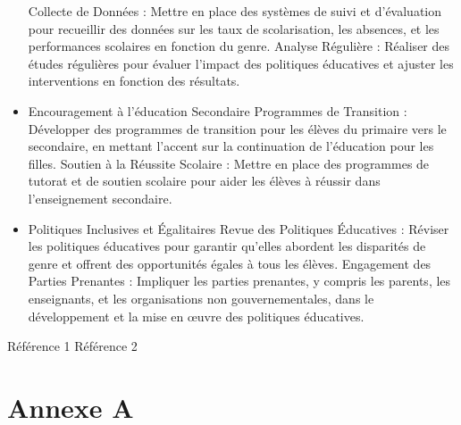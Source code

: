 \documentclass[a4paper,12pt]{report}
\begin{document}
\begin{itemize}{}
Collecte de Données : Mettre en place des systèmes de suivi et d'évaluation pour recueillir des données sur les taux de scolarisation, les absences, et les performances scolaires en fonction du genre.
Analyse Régulière : Réaliser des études régulières pour évaluer l'impact des politiques éducatives et ajuster les interventions en fonction des résultats.\\
\item Encouragement à l'éducation Secondaire
Programmes de Transition : Développer des programmes de transition pour les élèves du primaire vers le secondaire, en mettant l'accent sur la continuation de l'éducation pour les filles.
Soutien à la Réussite Scolaire : Mettre en place des programmes de tutorat et de soutien scolaire pour aider les élèves à réussir dans l'enseignement secondaire.\\
\item Politiques Inclusives et Égalitaires
Revue des Politiques Éducatives : Réviser les politiques éducatives pour garantir qu'elles abordent les disparités de genre et offrent des opportunités égales à tous les élèves.
Engagement des Parties Prenantes : Impliquer les parties prenantes, y compris les parents, les enseignants, et les organisations non gouvernementales, dans le développement et la mise en œuvre des politiques éducatives.
\end{itemize}
\begin{thebibliography}{99}
 Référence 1
 Référence 2
\end{thebibliography}

\appendix
\chapter*{Annexe A}
\end{document}
